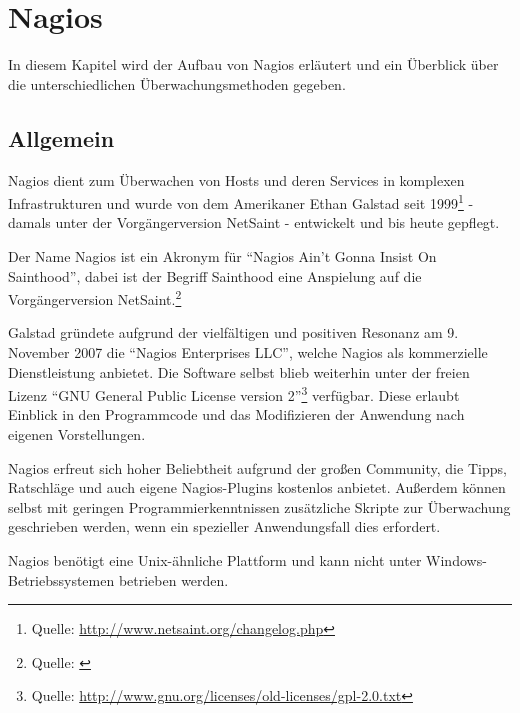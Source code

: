 \section{Nagios}

In diesem Kapitel wird der Aufbau von Nagios erläutert und ein Überblick über die unterschiedlichen Überwachungsmethoden gegeben.

\subsection{Allgemein}
Nagios dient zum Überwachen von Hosts und deren Services in komplexen Infrastrukturen und wurde von dem Amerikaner Ethan Galstad seit 1999\footnote{Quelle: \url{http://www.netsaint.org/changelog.php}} - damals unter der Vorgängerversion NetSaint - entwickelt und bis heute gepflegt.

Der Name Nagios ist ein Akronym für "`Nagios Ain't Gonna Insist On Sainthood"', dabei ist der Begriff Sainthood eine Anspielung auf die Vorgängerversion NetSaint.\footnote{Quelle: \cite{NagiosFAQ}}

Galstad gründete aufgrund der vielfältigen und positiven Resonanz am 9. November 2007 die "`Nagios Enterprises LLC"', welche Nagios als kommerzielle Dienstleistung anbietet.
Die Software selbst blieb weiterhin unter der freien Lizenz "`GNU General Public License version 2"'\footnote{Quelle: \url{http://www.gnu.org/licenses/old-licenses/gpl-2.0.txt}} verfügbar.
Diese erlaubt Einblick in den Programmcode und das Modifizieren der Anwendung nach eigenen Vorstellungen.

Nagios erfreut sich hoher Beliebtheit aufgrund der großen Community, die Tipps, Ratschläge und auch eigene Nagios-Plugins kostenlos anbietet.
Außerdem können selbst mit geringen Programmierkenntnissen zusätzliche Skripte zur Überwachung geschrieben werden, wenn ein spezieller Anwendungsfall dies erfordert.

Nagios benötigt eine Unix-ähnliche Plattform und kann nicht unter Windows-Betriebssystemen betrieben werden.








